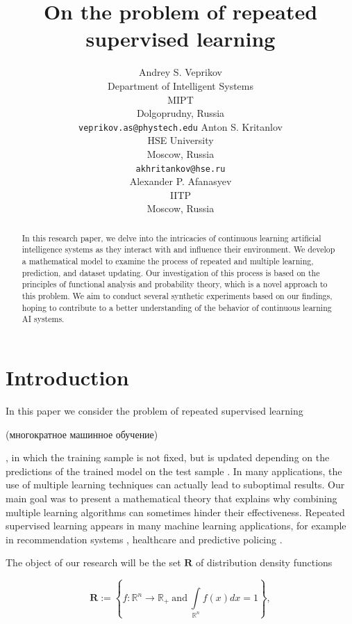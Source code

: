 \documentclass{article}
\title{On the problem of repeated supervised learning}
\author{
    Andrey S. Veprikov\\
	Department of Intelligent Systems\\
	MIPT\\
	Dolgoprudny, Russia \\
	\texttt{veprikov.as@phystech.edu} 
    \And
    Anton S. Kritanlov\\
    HSE University\\
    Moscow, Russia\\
    \texttt{akhritankov@hse.ru}\\
    \And
    Alexander P. Afanasyev \\
    IITP\\
    Moscow, Russia}
\date{}
\begin{document}
\maketitle

\begin{abstract}

    In this research paper, we delve into the intricacies of continuous learning artificial intelligence systems as they interact with and influence their environment. We develop a mathematical model to examine the process of repeated and multiple learning, prediction, and dataset updating. Our investigation of this process is based on the principles of functional analysis and probability theory, which is a novel approach to this problem. We aim to conduct several synthetic experiments based on our findings, hoping to contribute to a better understanding of the behavior of continuous learning AI systems.

\end{abstract}



\section{Introduction} \label{Introduction}

    In this paper we consider the problem of repeated supervised learning \begin{otherlanguage}{russian}(многократное машинное обучение)\end{otherlanguage}, in which the training sample is not fixed, but is updated depending on the predictions of the trained model on the test sample \cite{ma2020machine, khritankov2021existence, jiang2019degenerate}. In many applications, the use of multiple learning techniques can actually lead to suboptimal results. Our main goal was to present a mathematical theory that explains why combining multiple learning algorithms can sometimes hinder their effectiveness. Repeated supervised learning appears in many machine learning applications, for example in recommendation systems \cite{khritankov2021existence, sinha2016deconvolving}, healthcare \cite{adam2020hidden} and predictive policing \cite{ensign2018runaway}. 

    The object of our research will be the set $\mathbf{R}$ of distribution density functions

    \begin{equation}
        \label{R}
        \mathbf{R} := \left\{f : \mathbb{R}^n \rightarrow \mathbb{R}_+ ~\text{and}~ \int\limits_{\mathbb{R}^n}f(x)dx = 1\right\},
    \end{equation}
\end{document}
